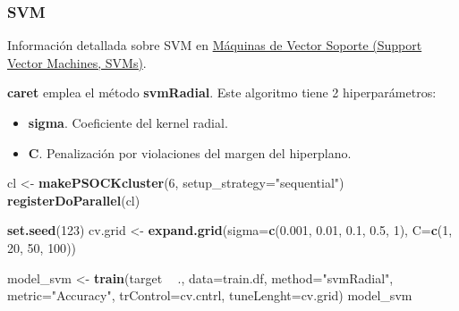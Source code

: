 \documentclass[]{article}
\newenvironment{Shaded}{\begin{snugshade}}{\end{snugshade}}
\newcommand{\DataTypeTok}[1]{\textcolor[rgb]{0.13,0.29,0.53}{#1}}
\newcommand{\DecValTok}[1]{\textcolor[rgb]{0.00,0.00,0.81}{#1}}
\newcommand{\FloatTok}[1]{\textcolor[rgb]{0.00,0.00,0.81}{#1}}
\newcommand{\KeywordTok}[1]{\textcolor[rgb]{0.13,0.29,0.53}{\textbf{#1}}}
\newcommand{\NormalTok}[1]{#1}
\newcommand{\OperatorTok}[1]{\textcolor[rgb]{0.81,0.36,0.00}{\textbf{#1}}}
\newcommand{\StringTok}[1]{\textcolor[rgb]{0.31,0.60,0.02}{#1}}
\begin{document}
\hypertarget{svm}{%
\subsubsection{SVM}\label{svm}}

Información detallada sobre SVM en
\href{https://www.cienciadedatos.net/documentos/34_maquinas_de_vector_soporte_support_vector_machines}{Máquinas
de Vector Soporte (Support Vector Machines, SVMs)}.

\textbf{caret} emplea el método \textbf{svmRadial}. Este algoritmo tiene
2 hiperparámetros:

\begin{itemize}
\item
  \textbf{sigma}. Coeficiente del kernel radial.
\item
  \textbf{C}. Penalización por violaciones del margen del hiperplano.
\end{itemize}

\begin{Shaded}
\begin{Highlighting}[]
\NormalTok{cl <-}\StringTok{ }\KeywordTok{makePSOCKcluster}\NormalTok{(}\DecValTok{6}\NormalTok{, }\DataTypeTok{setup_strategy=}\StringTok{"sequential"}\NormalTok{)}
\KeywordTok{registerDoParallel}\NormalTok{(cl)}
\end{Highlighting}
\end{Shaded}

\begin{Shaded}
\begin{Highlighting}[]
\KeywordTok{set.seed}\NormalTok{(}\DecValTok{123}\NormalTok{)}
\NormalTok{cv.grid <-}\StringTok{ }\KeywordTok{expand.grid}\NormalTok{(}\DataTypeTok{sigma=}\KeywordTok{c}\NormalTok{(}\FloatTok{0.001}\NormalTok{, }\FloatTok{0.01}\NormalTok{, }\FloatTok{0.1}\NormalTok{, }\FloatTok{0.5}\NormalTok{, }\DecValTok{1}\NormalTok{),}
                       \DataTypeTok{C=}\KeywordTok{c}\NormalTok{(}\DecValTok{1}\NormalTok{, }\DecValTok{20}\NormalTok{, }\DecValTok{50}\NormalTok{, }\DecValTok{100}\NormalTok{))}

\NormalTok{model_svm <-}\StringTok{ }\KeywordTok{train}\NormalTok{(target }\OperatorTok{~}\StringTok{ }\NormalTok{., }\DataTypeTok{data=}\NormalTok{train.df,}
                      \DataTypeTok{method=}\StringTok{"svmRadial"}\NormalTok{,}
                      \DataTypeTok{metric=}\StringTok{"Accuracy"}\NormalTok{,}
                      \DataTypeTok{trControl=}\NormalTok{cv.cntrl,}
                      \DataTypeTok{tuneLenght=}\NormalTok{cv.grid)}
\NormalTok{model_svm}
\end{Highlighting}
\end{Shaded}
\end{document}
